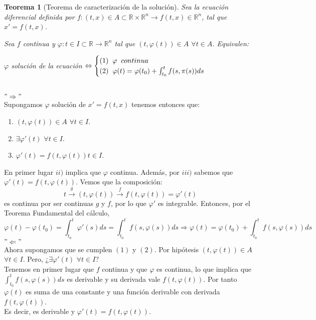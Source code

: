 \documentclass[11pt]{article}
\makeatletter
\theoremstyle{theorem-style}  %
\newtheorem{theorem}{Teorema}[section]  %
\renewenvironment{proof}[1][\proofname]{\par
	\pushQED{\qed}%
	\normalfont \topsep6\p@\@plus6\p@\relax
	\list{}{%
		\settowidth{\leftmargin}{\quad:\hskip\labelsep}%
		\setlength{\labelwidth}{0pt}%
		\setlength{\itemindent}{-\leftmargin}%
	}%
	\item[\hskip\labelsep\itshape#1\@addpunct{:}]\ignorespaces
}{%
	\popQED\endlist\@endpefalse
}
\theoremstyle{definition-style}
\theoremstyle{example-style}
\makeatother
\begin{document}
\begin{theorem}[Teorema de caracterización de la solución]\label{carac-sol}
	Sea la ecuación diferencial definida por $ f:(t,x) \in A \subset \mathbb{R}\times \mathbb{R}^n\longrightarrow f(t,x)\in \mathbb{R}^n$, tal que $ x'=f(t,x) $. 
	
	Sea $f$ continua y $\varphi :t \in I \subset \mathbb{R} \longrightarrow \mathbb{R}^n$ tal que $(t, \varphi (t)) \in A$ $\forall t \in A$. Equivalen:
	\begin{center}
		$\varphi$ solución de la ecuación $\Leftrightarrow \begin{cases}
		(1) \hspace{0,2cm} \varphi \hspace{0,2cm} continua \\
		(2) \hspace{0,2cm} \varphi (t)= \varphi (t_0) + \int_{t_0}^{t} f(s, \pi (s))ds
		\end{cases}$
	\end{center}
\end{theorem}
\begin{proof}\ \\
	$"\Rightarrow"$ \\
	Supongamos $\varphi$ solución de $x' = f(t, x)$ tenemos entonces que:
	\begin{enumerate}[\qquad i)]
	\item $(t, \varphi (t)) \in A$ $\forall t \in I$.
	\item $ \exists \varphi' (t)$ $\forall t \in I$.
	\item $ \varphi' (t) = f(t, \varphi (t)) t \in I$.
	\end{enumerate}
	En primer lugar $ii)$ implica que $\varphi$ continua. Además, por $iii)$ sabemos que $\varphi' (t) = f(t, \varphi (t))$. Vemos que la composición:
	\[t \stackrel{g}{\longrightarrow } (t, \varphi (t)) \stackrel{f}{\longrightarrow } f(t, \varphi (t)) = \varphi'(t)\]
	es continua por ser continuas $g$ y $f$, por lo que $\varphi '$ es integrable. Entonces, por el Teorema Fundamental del cálculo,
	\[\varphi (t) - \varphi (t_0) = \int_{t_0}^{t} \varphi' (s)ds = \int_{t_0}^{t} f(s, \varphi (s))ds \Rightarrow \varphi (t) = \varphi (t_0) + \int_{t_0}^{t} f(s, \varphi (s))ds\]
	$"\Leftarrow"$ \\
	Ahora supongamos que se cumplen $(1)$ y $(2)$. Por hipótesis $(t, \varphi (t)) \in A$ $\forall t \in I$. Pero, ¿$\exists \varphi' (t)$ $\forall t \in I$?\\
	Tenemos en primer lugar que $f$ continua y que $\varphi$ es continua, lo que implica que $\int_{t_0}^{t} f(s, \varphi (s))ds$ es derivable y su derivada vale $f(t, \varphi (t))$. Por tanto $\varphi (t)$ es suma de una constante y una función derivable con derivada $ f(t,\varphi(t)) $. \\
	Es decir, es derivable y $\varphi' (t) = f(t, \varphi (t))$.
\end{proof}
\end{document}
